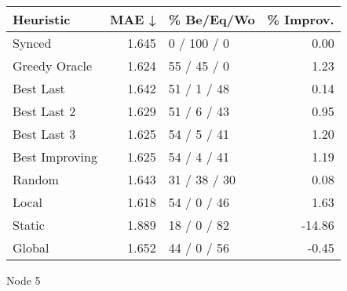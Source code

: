 \begin{tabular}{lrlr}
\toprule
\textbf{Heuristic} & \textbf{MAE ↓} & \textbf{\% Be/Eq/Wo} & \textbf{\% Improv.} \\
\midrule
            Synced &          1.645 &          0 / 100 / 0 &                0.00 \\
     Greedy Oracle &          1.624 &          55 / 45 / 0 &                1.23 \\
         Best Last &          1.642 &          51 / 1 / 48 &                0.14 \\
       Best Last 2 &          1.629 &          51 / 6 / 43 &                0.95 \\
       Best Last 3 &          1.625 &          54 / 5 / 41 &                1.20 \\
    Best Improving &          1.625 &          54 / 4 / 41 &                1.19 \\
            Random &          1.643 &         31 / 38 / 30 &                0.08 \\
             Local &          1.618 &          54 / 0 / 46 &                1.63 \\
            Static &          1.889 &          18 / 0 / 82 &              -14.86 \\
            Global &          1.652 &          44 / 0 / 56 &               -0.45 \\
\bottomrule
\end{tabular}
\caption{Node 5}
\label{tab:ds_non_lr01_le2_bs4_5}
